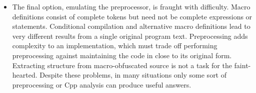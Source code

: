 \documentclass[10pt]{article}
\begin{document}
\begin{itemize}

\item The final option, emulating the preprocessor, is fraught with
  difficulty.  Macro definitions consist of complete tokens but need not be
  complete expressions or statements.  Conditional compilation and
  alternative macro definitions lead to very different results from a
  single original program text.  Preprocessing adds complexity to an
  implementation, which must trade off performing preprocessing against
  maintaining the code in close to its original form.  Extracting structure
  from macro-obfuscated source is not a task for the faint-hearted.
  Despite these problems, in many situations only some sort of
  preprocessing or Cpp analysis can produce useful answers.

\end{itemize}

\end{document}
